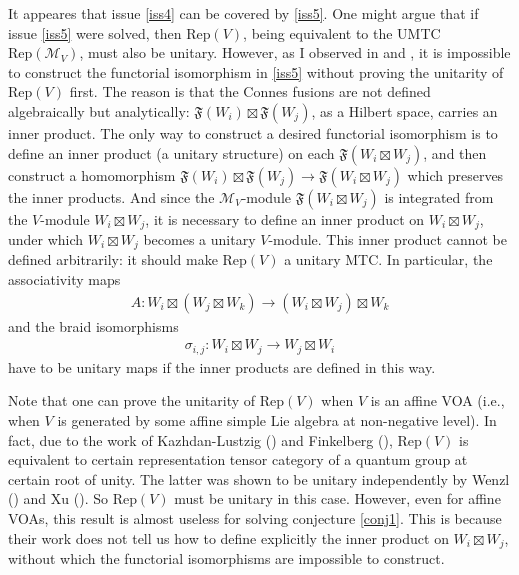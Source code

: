 \documentclass[10pt]{amsart}
\theoremstyle{definition}
\theoremstyle{plain}
\newcommand{\Rep}{\mathrm{Rep}}
\begin{document}
It appeares that issue \ref{iss4} can be covered by \ref{iss5}. One might argue that if issue \ref{iss5} were solved, then  $\Rep(V)$, being equivalent to the UMTC $\Rep(\mathcal M_V)$, must also be unitary. However, as I observed in \cite{G unitary1,G unitary2} and \cite{G equivalence}, it is impossible to construct the functorial isomorphism in \ref{iss5} without proving the unitarity of $\Rep(V)$ first. The reason is that the Connes fusions   are not defined algebraically but analytically:  $\mathfrak F(W_i)\boxtimes\mathfrak F(W_j)$, as a Hilbert space, carries an inner product. The only way to construct a desired functorial isomorphism  is to define an inner product (a unitary structure) on each $\mathfrak F(W_i\boxtimes W_j)$, and then construct a homomorphism $\mathfrak F(W_i)\boxtimes\mathfrak F(W_j)\rightarrow \mathfrak F(W_i\boxtimes W_j)$ which preserves the inner products. And since the $\mathcal M_V$-module $\mathfrak F(W_i\boxtimes W_j)$ is integrated from the $V$-module $W_i\boxtimes W_j$, it is necessary to define an inner product on $W_i\boxtimes W_j$, under which $W_i\boxtimes W_j$ becomes a unitary $V$-module. This inner product cannot be defined arbitrarily: it should make $\Rep(V)$ a unitary MTC. In particular, the associativity maps
\begin{align*}
A:W_i\boxtimes(W_j\boxtimes W_k)\rightarrow (W_i\boxtimes W_j)\boxtimes W_k
\end{align*}
and the braid isomorphisms
\begin{align*}
\sigma_{i,j}:W_i\boxtimes W_j\rightarrow W_j\boxtimes W_i
\end{align*}
have to be unitary maps if the inner products are defined in this way.


Note that one can prove the unitarity of $\Rep(V)$ when $V$ is an affine VOA (i.e., when $V$ is generated by some affine simple Lie algebra at non-negative level). In fact, due to the work of Kazhdan-Lustzig (\cite{KL1,KL2,KL3,KL4}) and Finkelberg (\cite{Fink}), $\Rep(V)$ is equivalent to certain representation  tensor category of a quantum group at certain root of unity. The latter was shown to be unitary independently by Wenzl (\cite{Wenzl unitary}) and Xu (\cite{Xu unitary}). So $\Rep(V)$ must be unitary in this case. However, even for affine VOAs, this result is almost useless for solving conjecture \ref{conj1}. This is because their work does not tell us how to define explicitly the inner product on $W_i\boxtimes W_j$, without which the functorial isomorphisms are impossible to construct.
\end{document}
